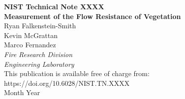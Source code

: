 \documentclass[12pt]{article}
\newcommand{\pubnumber}{XXXX}
\newcommand{\DOI}{https://doi.org/10.6028/NIST.TN.XXXX}
\newcommand{\monthyear}{Month Year}
\begin{document}
\begin{titlepage}
\begin{flushright}
\LARGE{\textbf{NIST Technical Note \pubnumber}}\\
\vfill
\Huge{\textbf{Measurement of the Flow Resistance of Vegetation}}\\
\vfill
\normalsize Ryan Falkenstein-Smith\\
Kevin McGrattan\\
Marco Fernandez\\
\textit{Fire Research Division}\\
\textit{Engineering Laboratory}\\
\vspace{12pt}
\vfill
\normalsize This publication is available free of charge from:\\
\DOI\\
\vfill
\normalsize \monthyear
\vfill


\end{flushright}
\end{titlepage}
\end{document}

